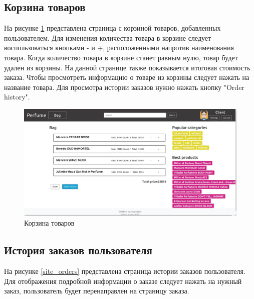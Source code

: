 \subsection{Корзина товаров}

На рисунке \ref{site_bag} представлена страница с корзиной товаров, добавленных пользователем. Для изменения количества товара в корзине следует воспользоваться кнопками - и +, расположенными напротив наименования товара. Когда количество товара в корзине станет равным нулю, товар будет удален из корзины. На данной странице также показывается итоговая стоимость заказа. Чтобы просмотреть информацию о товаре из корзины следует нажать на название товара. Для просмотра истории заказов нужно нажать кнопку "Order history".

\captionsetup{singlelinecheck = false, justification=centering}
\begin{figure}[h!]
	\begin{center}
		\includegraphics[scale=0.45]{assets/site_bag.jpg}
	\end{center}
	\caption{Корзина товаров}
	\label{site_bag}
\end{figure}

\subsection{История заказов пользователя}

На рисунке \ref{site_orders} представлена страница истории заказов пользователя. Для отображения подробной информации о заказе следует нажать на нужный заказ, пользователь будет перенаправлен на страницу заказа.

